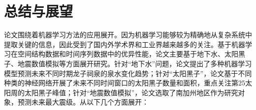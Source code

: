 \chapter{总结与展望}\label{chap:conclusion}


论文围绕着机器学习方法的应用展开。因为机器学习能够较为精确地从复杂系统中提取关键的信息，因此受到了国内外学术界和工业界越来越多的关注。基于机器学习在空间结构数据和时间序列数据中的优异性能，论文主要基于地下水、太阳黑子、地震数值模拟等方面展开研究。针对“地下水”问题，论文提出了多种机器学习模型预测未来不同时期龙子祠泉的泉水变化趋势；针对“太阳黑子”，论文基于不同种类的神经网络开展了未来不同时间窗口的太阳黑子数量和面积，重点关注第25太阳周的太阳黑子峰值；针对“地震数值模拟”，论文选取了南加州地区作为研究对象，预测未来最大震级。从以下几个方面展开：

